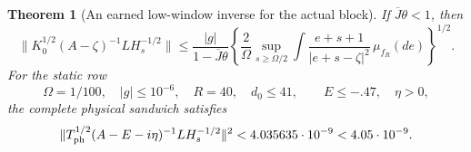 \documentclass[11pt]{article}
\numberwithin{equation}{section}
\newtheorem{theorem}{Theorem}[section]
\theoremstyle{definition}
\theoremstyle{remark}
\begin{document}
\begin{theorem}[An earned low-window inverse for the actual block]
\label{p4h:thm:lowwindow}
If $\overline J\theta<1$, then
\begin{equation}\label{p4h:eq:lowgeneral}
 \|K_0^{1/2}(A-\zeta)^{-1}LH_s^{-1/2}\|
 \leq\frac{|g|}{1-\overline J\theta}
 \left\{\frac2\Omega\sup_{s\geq\Omega/2}
 \int\frac{e+s+1}{|e+s-\zeta|^2}\,\mu_{f_R}(de)\right\}^{1/2}.
\end{equation}
For the static row
\begin{equation}\label{p4h:eq:parameters}
 \Omega=1/100,\quad |g|\leq10^{-6},\quad R=40,\quad d_0\leq41,
 \qquad E\leq-.47,\quad\eta>0,
\end{equation}
the complete physical sandwich satisfies
\begin{equation}\label{p4h:eq:lowrow}
 \|T_{\rm ph}^{1/2}(A-E-i\eta)^{-1}LH_s^{-1/2}\|^2
                  <4.035635\cdot10^{-9}<4.05\cdot10^{-9}.
\end{equation}
\end{theorem}
\end{document}

